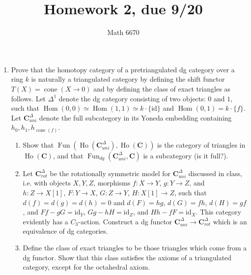 \documentclass[10pt]{article}
\title{Homework 2, due 9/20}
\author{Math 6670}
\theoremstyle{definition}
\DeclareMathOperator{\Hom}{Hom}
\DeclareMathOperator{\Ho}{Ho}
\DeclareMathOperator{\cone}{cone}
\DeclareMathOperator{\Fun}{Fun}
\newcommand{\cat}{\mathbf}
\begin{document}
\maketitle

\begin{enumerate}
\item Prove that the homotopy category of a pretriangulated dg category over a ring $k$ is naturally a triangulated category by defining the shift functor $T(X) = \cone(X \rightarrow 0)$ and by defining the class of exact triangles as follows.  Let $\Delta^1$ denote the dg category consisting of two objects: $0$ and $1$, such that $\Hom(0, 0) \simeq \Hom(1, 1) \simeq k \cdot \{\mathrm{id}\}$ and $\Hom(0, 1) = k \cdot \{f\}$.  Let $\cat{C}^\Delta_{uni}$ denote the full subcategory in its Yoneda embedding containing $h_0, h_1, h_{\cone(f)}$.
\begin{enumerate}
\item Show that $\Fun(\Ho(\cat{C}^\Delta_{uni}), \Ho(\cat{C}))$ is the category of triangles in $\Ho(\cat{C})$, and that $\Fun_{dg}(\cat{C}^\Delta_{uni}, \cat{C})$ is a subcategory (is it full?).
\item Let $\cat{C}^\Delta_{rot}$ be the rotationally symmetric model for $\cat{C}^\Delta_{uni}$ discussed in class, i.e. with objects $X, Y, Z$, morphisms $f: X \rightarrow Y$, $g: Y \rightarrow Z$, and $h: Z \rightarrow X[1]$, $F: Y \rightarrow X$, $G: Z \rightarrow Y$, $H: X[1] \rightarrow Z$, such that $d(f) = d(g) = d(h) = 0$ and $d(F) = hg$, $d(G) = fh$, $d(H) = gf$, and $Ff - gG = \mathrm{id}_Y$, $Gg - hH = \mathrm{id}_Z$, and $Hh - fF = \mathrm{id}_X$.  This category evidently has a $C_3$-action.  Construct a dg functor $\cat{C}^\Delta_{uni} \rightarrow \cat{C}^\Delta_{rot}$ which is an equivalence of dg categories.
\item Define the class of exact triangles to be those triangles which come from a dg functor.  Show that this class satisfies the axioms of a triangulated category, except for the octahedral axiom.
\end{enumerate}



\end{enumerate}
\end{document}
